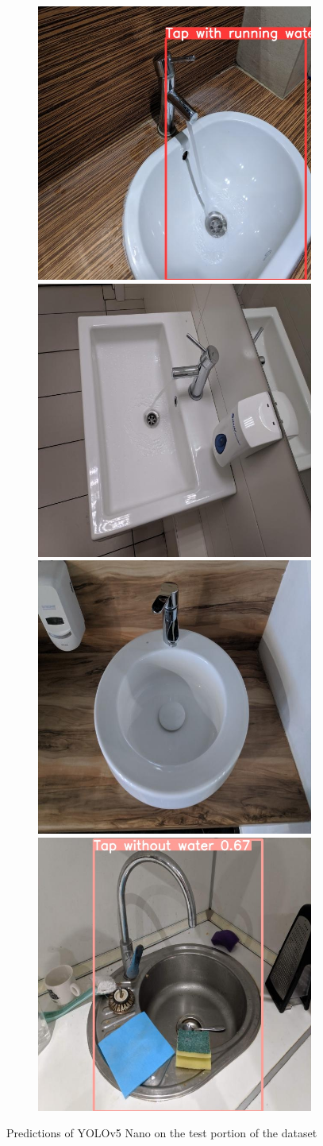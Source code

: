 \documentclass[journal,onecolumn]{IEEEtran}
\begin{document}
\begin{figure}[htb]
    \centering
    \begin{subfigure}[b]{\textwidth}
        \centering
        \includegraphics[width=0.475\linewidth]{figures/yolov5-prediction-1.jpg}%
        \hfill
        \includegraphics[width=0.475\linewidth]{figures/yolov5-prediction-2.jpg}%
        \hfill
        \includegraphics[width=0.475\linewidth]{figures/yolov5-prediction-3.jpg}%
        \hfill
        \includegraphics[width=0.475\linewidth]{figures/yolov5-prediction-4.jpg}
    \end{subfigure}
    \caption{Predictions of YOLOv5 Nano on the test portion of the dataset}
\end{figure}
\end{document}

